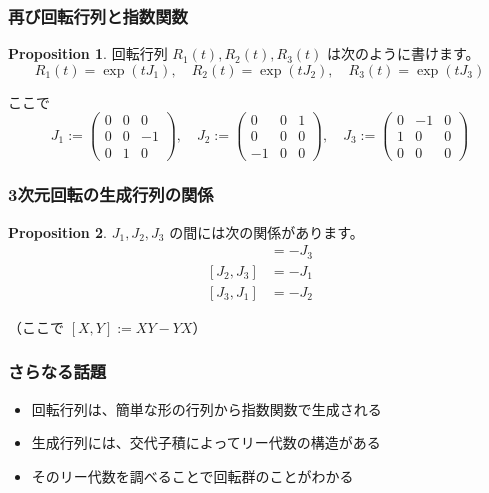 \documentclass{beamer}
\theoremstyle{definition}
\newtheorem{proposition}{Proposition}
\begin{document}
\begin{frame}
    \frametitle{再び回転行列と指数関数}

    \begin{proposition}
        回転行列 \(R_1(t), R_2(t), R_3(t)\) は次のように書けます。
        \[
            R_1(t) = \exp (tJ_1), \quad
            R_2(t) = \exp (tJ_2), \quad
            R_3(t) = \exp (tJ_3)
        \]
        \begin{footnotesize}
            ここで
            \[
                J_1 :=
                \begin{pmatrix}
                    0 & 0 & 0 \\
                    0 & 0 & -1 \\
                    0 & 1 & 0
                \end{pmatrix}, \quad
                J_2 :=
                \begin{pmatrix}
                    0 & 0 & 1 \\
                    0 & 0 & 0 \\
                    -1 & 0 & 0
                \end{pmatrix}, \quad
                J_3 :=
                \begin{pmatrix}
                    0 & -1 & 0 \\
                    1 & 0 & 0 \\
                    0 & 0 & 0
                \end{pmatrix}
            \]
        \end{footnotesize}
    \end{proposition}
\end{frame}

\begin{frame}
    \frametitle{3次元回転の生成行列の関係}

    \begin{proposition}
        \(J_1, J_2, J_3\) の間には次の関係があります。
        \begin{align*}
            [J_1, J_2] & = - J_3 \\
            [J_2, J_3] & = - J_1 \\
            [J_3, J_1] & = - J_2
        \end{align*}

        （ここで \([X, Y] := XY - YX\)）
    \end{proposition}
\end{frame}

\begin{frame}
    \frametitle{さらなる話題}

    \begin{itemize}
        \item 回転行列は、簡単な形の行列から指数関数で生成される
        \item 生成行列には、交代子積によってリー代数の構造がある
        \item そのリー代数を調べることで回転群のことがわかる
    \end{itemize}
\end{frame}
\end{document}
